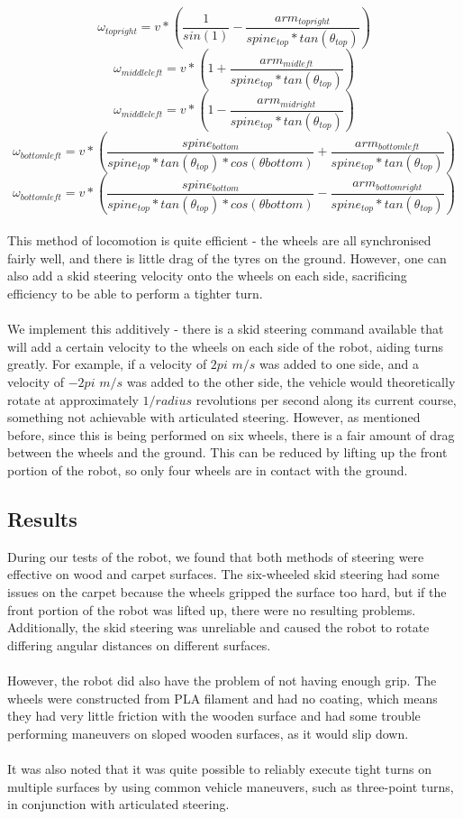 \documentclass[]{article}
\begin{document}
\[ \omega_{topright} = v * (\frac{1}{sin(1)} - \frac{arm_{topright}}{spine_{top} * tan(\theta_{top})}) \]
\[ \omega_{middleleft} = v * (1 + \frac{arm_{midleft}}{spine_{top} * tan(\theta_{top})}) \]
\[ \omega_{middleleft} = v * (1 - \frac{arm_{midright}}{spine_{top} * tan(\theta_{top})}) \]
\[ \omega_{bottomleft} = v * (\frac{spine_{bottom}}{spine_{top} * tan(\theta_{top}) * cos(\theta{bottom})} + \frac{arm_{bottomleft}}{spine_{top} * tan(\theta_{top})}) \]
\[ \omega_{bottomleft} = v * (\frac{spine_{bottom}}{spine_{top} * tan(\theta_{top}) * cos(\theta{bottom})} - \frac{arm_{bottomright}}{spine_{top} * tan(\theta_{top})}) \]
\\
This method of locomotion is quite efficient - the wheels are all synchronised fairly well, and there is little drag of the tyres on the ground. However, one can also add a skid steering velocity onto the wheels on each side, sacrificing efficiency to be able to perform a tighter turn.
\\
\\
We implement this additively - there is a skid steering command available that will add a certain velocity to the wheels on each side of the robot, aiding turns greatly. For example, if a velocity of $2pi$ $m/s$ was added to one side, and a velocity of $-2pi$ $m/s$ was added to the other side, the vehicle would theoretically rotate at approximately $1 / radius$ revolutions per second along its current course, something not achievable with articulated steering. However, as mentioned before, since this is being performed on six wheels, there is a fair amount of drag between the wheels and the ground. This can be reduced by lifting up the front portion of the robot, so only four wheels are in contact with the ground.

\subsection{Results}
During our tests of the robot, we found that both methods of steering were effective on wood and carpet surfaces. The six-wheeled skid steering had some issues on the carpet because the wheels gripped the surface too hard, but if the front portion of the robot was lifted up, there were no resulting problems. Additionally, the skid steering was unreliable and caused the robot to rotate differing angular distances on different surfaces.
\\
\\
However, the robot did also have the problem of not having enough grip. The wheels were constructed from PLA filament and had no coating, which means they had very little friction with the wooden surface and had some trouble performing maneuvers on sloped wooden surfaces, as it would slip down.
\\
\\
It was also noted that it was quite possible to reliably execute tight turns on multiple surfaces by using common vehicle maneuvers, such as three-point turns, in conjunction with articulated steering.
\end{document}
